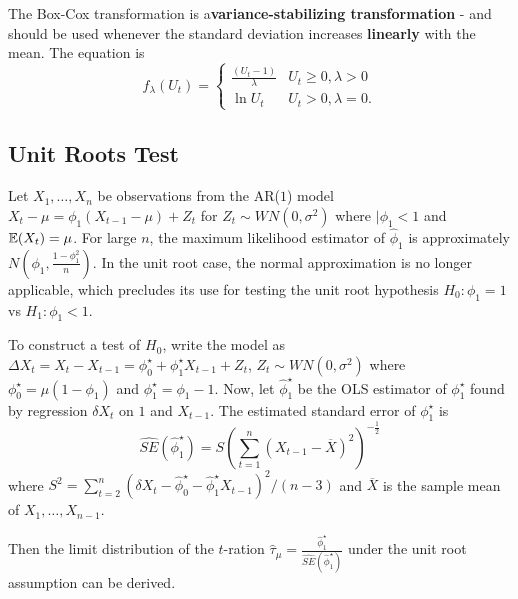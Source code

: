 \begin{defn}
  \label{sec:arima-processes-3}
  The Box-Cox transformation is a\textbf{variance-stabilizing
    transformation} - and should be used whenever the standard
  deviation increases \textbf{linearly} with the mean. The equation is
  \begin{equation}
    \label{eq:77}
    f_{\lambda}(U_{t}) =
    \begin{cases}
      \frac{(U_{t} - 1)}{\lambda}  & U_{t} \geq 0, \lambda > 0 \\
      \ln U_{t} & U_{t} > 0, \lambda = 0.
    \end{cases}
  \end{equation}
\end{defn}

\subsection{Unit Roots Test}
\label{sec:unit-roots-test}

\begin{thm}
  \label{sec:unit-roots-test}
  Let $X_{1}, \dots, X_{n}$ be observations from the AR($1$) model
  $X_{t} - \mu = \phi_{1}(X_{t -1} - \mu) + Z_{t}$ for $Z_{t} \sim
  WN(0, \sigma^{2})$ where $|\phi_{1} < 1$ and $\E{X_{t}} = \mu$.  For
  large $n$, the maximum likelihood estimator of $\hat \phi_{1}$ is
  approximately $N(\phi_{1}, \frac{1 - \phi_{1}^{2}}{n} )$.  In the
  unit root case, the normal approximation is no longer applicable,
  which precludes its use for testing the unit root hypothesis $H_{0}:
  \phi_{1} = 1$ vs $H_{1}: \phi_{1} < 1$.

  To construct a test of $H_{0}$, write the model as $\Delta X_{t} =
  X_{t} - X_{t-1} = \phi^{\star}_{0} + \phi^{\star}_{1} X_{t-1} + Z_{t}$,
  $Z_{t} \sim WN(0, \sigma^{2})$ where $\phi^{\star}_{0} = \mu(1 -
  \phi_{1})$ and $\phi^{\star}_{1} = \phi_{1} - 1$.  Now, let $\hat
  \phi_{1}^{\star}$ be the OLS estimator of $\phi_{1}^{\star}$ found
  by regression $\delta X_{t}$ on $1$ and $X_{t-1}$.  The estimated
  standard error of $\phi_{1}^{\star}$ is
  \begin{equation}
    \label{eq:77}
    \hat{SE} (\hat \phi_{1}^{\star}) = S(\sum_{t=1}^{n} (X_{t-1} -
    \overline X)^{2})^{-\frac{1}{2}}
  \end{equation} where $S^{2} = \sum_{t=2}^{n} (\delta X_{t} - \hat
  \phi_{0}^{\star} - \hat \phi_{1}^{\star} X_{t-1})^{2} / (n - 3)$ and
  $\overline X$ is the sample mean of $X_{1}, \dots, X_{n-1}$.

  Then the limit distribution of the $t$-ration $\hat \tau_{\mu}=
  \frac{\hat \phi_{1}^{\star}}{\hat{SE}(\hat \phi_{1}^{\star})}$ under
  the unit root assumption can be derived.
\end{thm}

